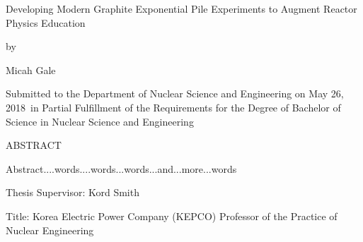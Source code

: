 \documentclass{article}
\newcommand{\thesis}{Developing Modern Graphite Exponential Pile Experiments to Augment Reactor Physics Education}
\newcommand{\me}{Micah Gale}
\newcommand{\signDate}{May 26, 2018}
\newcommand{\advisorName}{Kord Smith}
\newcommand{\advisorTitle}{Korea Electric Power Company (KEPCO) Professor of the Practice of Nuclear Engineering}
\newcommand{\abstractart}{   
    Abstract....words....words...words...and...more...words
    }
\begin{document}
\newpage
\begin{titlepage}
    \begin{center}
    {\large{\thesis}}
    
    \bigskip
    {by}
    
    \bigskip
    {\me}
    
    \bigskip
    {\parbox{3.7in}{\centering Submitted to the Department of Nuclear Science and Engineering on {\signDate}\ in Partial Fulfillment of the Requirements for the Degree of Bachelor of Science in Nuclear Science and Engineering}}
    \end{center}
    \bigskip
    
    \begin{flushleft}
    ABSTRACT
    
    \bigskip
    \abstractart
    \vfill
    {Thesis Supervisor: \advisorName}
    
    {Title: \advisorTitle}
    \end{flushleft}
    
\end{titlepage}
\end{document}
